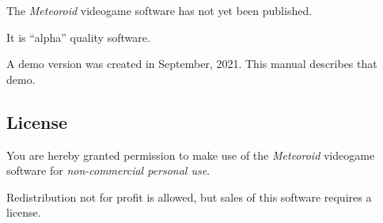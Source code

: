 \documentclass[10pt,twocolumn,openany,article]{memoir}
\begin{document}
The \textit{Meteoroid} videogame software has not yet been published.

It is ``alpha'' quality software.

A  demo version  was created  in September,  2021. \ifdefined\DEMO  This
manual describes that demo. \fi

\subsection{License}

You are hereby granted permission  to make use of the \textit{Meteoroid}
videogame software for \emph{non-commercial personal use}.

Redistribution not for profit is allowed, but sales of this software
requires a license.
\end{document}
